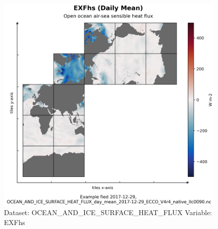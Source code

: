 \begin{figure}[H]
\centering
\includegraphics[scale=0.55]{../images/plots/native_plots/Ocean_and_Sea-Ice_Surface_Heat_Fluxes/EXFhs.png}
\caption{Dataset: OCEAN\_AND\_ICE\_SURFACE\_HEAT\_FLUX Variable: EXFhs}
\label{tab:table-OCEAN_AND_ICE_SURFACE_HEAT_FLUX_EXFhs-Plot}
\end{figure}
\pagebreak
